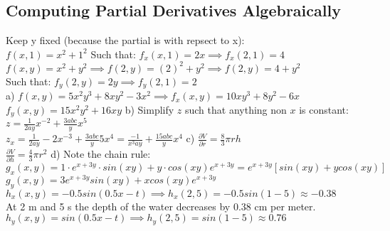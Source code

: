 \documentclass{article}
\begin{document}
\subsection{Computing Partial Derivatives Algebraically}
\sol Keep y fixed (because the partial is with repsect to x):\\
$f(x,1) = x^2 + 1^2$ Such that: $f_x(x,1) = 2x \implies f_x(2,1) = 4$
\double $f(x,y) = x^2 + y^2 \implies f(2,y) = (2)^2 + y^2 \implies f(2,y) = 4 + y^2$
\\Such that: $f_y(2,y) = 2y \implies f_y(2,1) = 2$
\sol\\
a) $f(x,y) = 5x^2y^3+8xy^2-3x^2 \implies f_x(x,y) = 10xy^3+8y^2-6x$
\\ $f_y(x,y) = 15x^2y^2+16xy$
\double
b) Simplify $z$ such that anything non $x$ is constant: $z = \frac{1}{2ay} x^{-2} + \frac{3abc}{y} x^5$
\\$z_x = \frac{1}{2ay} -2x^{-3} + \frac{3abc}{y} 5x^4 = \frac{-1}{x^3ay} + \frac{15abc}{y} x^4$
\double
c) $\frac{\partial V}{\partial r} = \frac{8}{3}\pi r h$ 
\\ $\frac{\partial V}{\partial h} = \frac{4}{3} \pi r^2$
\double
d) Note the chain rule:
\\$g_x(x,y) = 1 \cdot e^{x+3y} \cdot sin(xy) + y \cdot cos(xy) e^{x+3y} = e^{x+3y}[sin(xy) + ycos(xy)]$ 
\\$g_y(x,y) = 3e^{x+3y} sin(xy) + xcos(xy) e^{x+3y}$
\sol $h_x(x,y) = -0.5sin(0.5x - t) \implies h_x(2,5) = -0.5sin(1 - 5) \approx -0.38$
\\ At 2 m and 5 s the depth of the water decreases by 0.38 cm per meter. 
\\ $h_y(x,y) = sin(0.5x - t) \implies h_y(2,5) = sin(1-5) \approx 0.76 $
\end{document}
